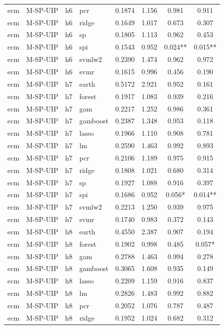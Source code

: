 \begin{ThreePartTable}
\begin{longtable}[t]{llclcccc}
ecm & M-SP-UIP & h6 & pcr & 0.1874 & 1.156 & 0.981 & 0.911\\
ecm & M-SP-UIP & h6 & ridge & 0.1649 & 1.017 & 0.673 & 0.307\\
ecm & M-SP-UIP & h6 & sp & 0.1805 & 1.113 & 0.962 & 0.453\\
ecm & M-SP-UIP & h6 & spi & 0.1543 & 0.952 & 0.024** & 0.015**\\
ecm & M-SP-UIP & h6 & svmlw2 & 0.2390 & 1.474 & 0.962 & 0.972\\
ecm & M-SP-UIP & h6 & svmr & 0.1615 & 0.996 & 0.456 & 0.190\\
\addlinespace
ecm & M-SP-UIP & h7 & earth & 0.5172 & 2.921 & 0.952 & 0.161\\
ecm & M-SP-UIP & h7 & forest & 0.1917 & 1.083 & 0.939 & 0.216\\
ecm & M-SP-UIP & h7 & gam & 0.2217 & 1.252 & 0.986 & 0.361\\
ecm & M-SP-UIP & h7 & gamboost & 0.2387 & 1.348 & 0.953 & 0.118\\
ecm & M-SP-UIP & h7 & lasso & 0.1966 & 1.110 & 0.908 & 0.781\\
ecm & M-SP-UIP & h7 & lm & 0.2590 & 1.463 & 0.992 & 0.893\\
ecm & M-SP-UIP & h7 & pcr & 0.2106 & 1.189 & 0.975 & 0.915\\
ecm & M-SP-UIP & h7 & ridge & 0.1808 & 1.021 & 0.680 & 0.314\\
ecm & M-SP-UIP & h7 & sp & 0.1927 & 1.088 & 0.916 & 0.397\\
ecm & M-SP-UIP & h7 & spi & 0.1686 & 0.952 & 0.056* & 0.014**\\
ecm & M-SP-UIP & h7 & svmlw2 & 0.2213 & 1.250 & 0.939 & 0.975\\
ecm & M-SP-UIP & h7 & svmr & 0.1740 & 0.983 & 0.372 & 0.143\\
\addlinespace
ecm & M-SP-UIP & h8 & earth & 0.4550 & 2.387 & 0.907 & 0.194\\
ecm & M-SP-UIP & h8 & forest & 0.1902 & 0.998 & 0.485 & 0.057*\\
ecm & M-SP-UIP & h8 & gam & 0.2788 & 1.463 & 0.994 & 0.278\\
ecm & M-SP-UIP & h8 & gamboost & 0.3065 & 1.608 & 0.935 & 0.149\\
ecm & M-SP-UIP & h8 & lasso & 0.2209 & 1.159 & 0.916 & 0.837\\
ecm & M-SP-UIP & h8 & lm & 0.2826 & 1.483 & 0.992 & 0.882\\
ecm & M-SP-UIP & h8 & pcr & 0.2052 & 1.076 & 0.787 & 0.487\\
ecm & M-SP-UIP & h8 & ridge & 0.1952 & 1.024 & 0.682 & 0.312\\

\end{longtable}
\end{ThreePartTable}
